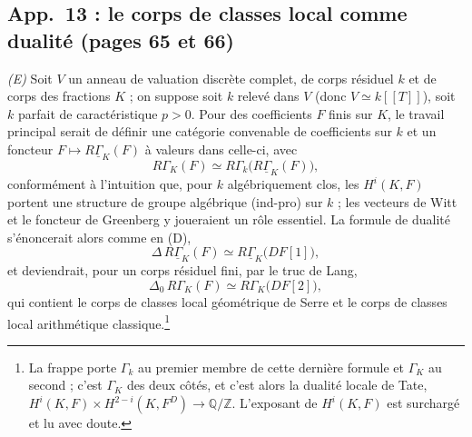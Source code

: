 \documentclass[11pt,a4paper]{article}
\begin{document}
\subsection*{App.~13 : le corps de classes local comme dualité (pages 65 et 66)}

\emph{(E)} Soit $V$ un anneau de valuation discrète complet, de corps
résiduel $k$ et de corps des fractions $K$ ; on suppose soit $k$ relevé dans
$V$ (donc $V \simeq k[[T]]$), soit $k$ parfait de caractéristique $p>0$.
Pour des coefficients $F$ finis sur $K$, le travail principal serait de
définir une catégorie convenable de coefficients sur $k$ et un foncteur
$F \mapsto R\underline{\Gamma}_K(F)$ à valeurs dans celle-ci, avec
\[
R\Gamma_K(F) \simeq R\Gamma_k\bigl(R\underline{\Gamma}_K(F)\bigr),
\]
conformément à l'intuition que, pour $k$ algébriquement clos, les
$H^i(K,F)$ portent une structure de groupe algébrique (ind-pro) sur $k$ ;
les vecteurs de Witt et le foncteur de Greenberg y joueraient un rôle
essentiel. La formule de dualité s'énoncerait alors comme en (D),
\[
\Delta\,R\underline{\Gamma}_K(F) \simeq R\underline{\Gamma}_K\bigl(DF[1]\bigr),
\]
et deviendrait, pour un corps résiduel fini, par le truc de Lang,
\[
\Delta_0\,R\Gamma_K(F) \simeq R\Gamma_K\bigl(DF[2]\bigr),
\]
qui contient le corps de classes local géométrique de Serre et le corps de
classes local arithmétique classique.\footnote{La frappe porte $\Gamma_k$ au
premier membre de cette dernière formule et $\Gamma_K$ au second ; c'est
$\Gamma_K$ des deux côtés, et c'est alors la dualité locale de Tate,
$H^i(K,F)\times H^{2-i}(K,F^D)\to\mathbb{Q}/\mathbb{Z}$. L'exposant de
$H^i(K,F)$ est surchargé et lu avec doute.}
\end{document}
